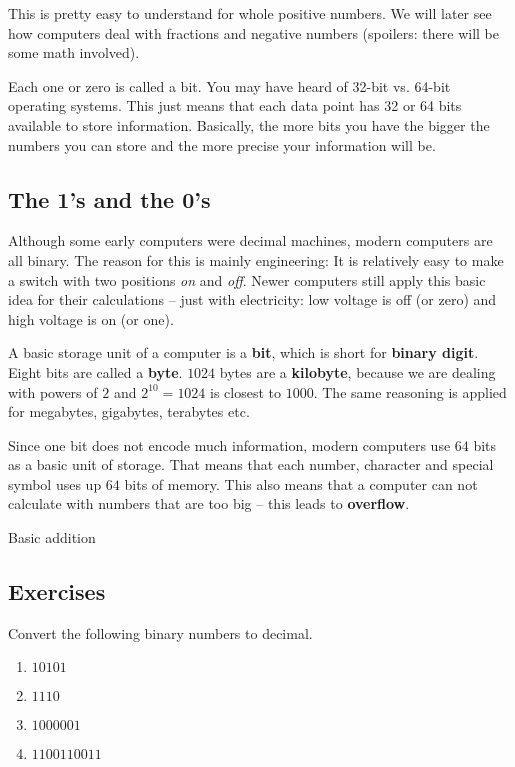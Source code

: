 \documentclass[11pt,a4paper]{report}
\newcommand{\bfb}[1]{{\bf \color{blue} #1}}
\begin{document}
This is pretty easy to understand for whole positive numbers. We will later see how computers deal with fractions and negative numbers (spoilers: there will be some math involved).

Each one or zero is called a bit. You may have heard of 32-bit vs. 64-bit operating systems. This just means that each data point has 32 or 64 bits available to store information. Basically, the more bits you have the bigger the numbers you can store and the more precise your information will be.

\subsection{The 1's and the 0's}
Although some early computers were decimal machines, modern  computers are all binary. The reason for this is mainly engineering: It is relatively easy to make a switch with two positions \emph{on} and \emph{off}. Newer computers still apply this basic idea for their calculations -- just with electricity: low voltage is off (or zero) and high voltage is on (or one).

A basic storage unit of a computer is a \bfb{bit}, which is short for \bfb{binary digit}. Eight bits are called a \bfb{byte}. $1024$ bytes are a \bfb{kilobyte}, because we are dealing with powers of $2$ and $2^{10}=1024$ is closest to $1000$. The same reasoning is applied for megabytes, gigabytes, terabytes etc. 

Since one bit does not encode much information, modern computers use $64$ bits as a basic unit of storage. That means that each number, character and special symbol uses up $64$ bits of memory. This also means that a computer can not calculate with numbers that are too big -- this leads to \bfb{overflow}.

Basic addition 

\subsection{Exercises}

\begin{ex}
Convert the following binary numbers to decimal.
\begin{multicols}{4}
\begin{enumerate}
\item $10101$
\item $1110$
\item $1000001$
\item $1100110011$
\end{enumerate}
\end{multicols} 
\end{ex}
\end{document}
